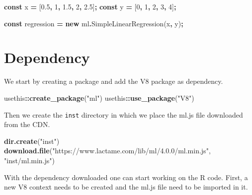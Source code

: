 \documentclass[
]{krantz}
\makeatletter
\newenvironment{Shaded}{\begin{snugshade}}{\end{snugshade}}
\newcommand{\DecValTok}[1]{\textcolor[rgb]{0.06,0.06,0.06}{#1}}
\newcommand{\FloatTok}[1]{\textcolor[rgb]{0.06,0.06,0.06}{#1}}
\newcommand{\FunctionTok}[1]{\textcolor[rgb]{0,0,0}{#1}}
\newcommand{\KeywordTok}[1]{\textcolor[rgb]{0.27,0.27,0.27}{\textbf{#1}}}
\newcommand{\NormalTok}[1]{#1}
\newcommand{\OperatorTok}[1]{\textcolor[rgb]{0.43,0.43,0.43}{\textbf{#1}}}
\newcommand{\StringTok}[1]{\textcolor[rgb]{0.5,0.5,0.5}{#1}}
\newenvironment{kframe}{%
\medskip{}
\setlength{\fboxsep}{.8em}
 \def\at@end@of@kframe{}%
 \ifinner\ifhmode%
  \def\at@end@of@kframe{\end{minipage}}%
  \begin{minipage}{\columnwidth}%
 \fi\fi%
 \def\FrameCommand##1{\hskip\@totalleftmargin \hskip-\fboxsep
 \colorbox{shadecolor}{##1}\hskip-\fboxsep
     \hskip-\linewidth \hskip-\@totalleftmargin \hskip\columnwidth}%
 \MakeFramed {\advance\hsize-\width
   \@totalleftmargin\z@ \linewidth\hsize
   \@setminipage}}%
 {\par\unskip\endMakeFramed%
 \at@end@of@kframe}
\renewenvironment{Shaded}{\begin{kframe}}{\end{kframe}}
\makeatother
\begin{document}
\begin{Shaded}
\begin{Highlighting}[]
\KeywordTok{const}\NormalTok{ x }\OperatorTok{=}\NormalTok{ [}\FloatTok{0.5}\OperatorTok{,} \DecValTok{1}\OperatorTok{,} \FloatTok{1.5}\OperatorTok{,} \DecValTok{2}\OperatorTok{,} \FloatTok{2.5}\NormalTok{]}\OperatorTok{;}
\KeywordTok{const}\NormalTok{ y }\OperatorTok{=}\NormalTok{ [}\DecValTok{0}\OperatorTok{,} \DecValTok{1}\OperatorTok{,} \DecValTok{2}\OperatorTok{,} \DecValTok{3}\OperatorTok{,} \DecValTok{4}\NormalTok{]}\OperatorTok{;}

\KeywordTok{const}\NormalTok{ regression }\OperatorTok{=} \KeywordTok{new}\NormalTok{ ml}\OperatorTok{.}\FunctionTok{SimpleLinearRegression}\NormalTok{(x}\OperatorTok{,}\NormalTok{ y)}\OperatorTok{;}
\end{Highlighting}
\end{Shaded}

\hypertarget{dependency-1}{%
\section*{Dependency}\label{dependency-1}}


We start by creating a package and add the V8 package as dependency.

\begin{Shaded}
\begin{Highlighting}[]
\NormalTok{usethis}\OperatorTok{::}\KeywordTok{create\_package}\NormalTok{(}\StringTok{"ml"}\NormalTok{)}
\NormalTok{usethis}\OperatorTok{::}\KeywordTok{use\_package}\NormalTok{(}\StringTok{"V8"}\NormalTok{)}
\end{Highlighting}
\end{Shaded}

Then we create the \texttt{inst} directory in which we place the ml.js file downloaded from the CDN.

\begin{Shaded}
\begin{Highlighting}[]
\KeywordTok{dir.create}\NormalTok{(}\StringTok{"inst"}\NormalTok{)}
\KeywordTok{download.file}\NormalTok{(}\StringTok{"https://www.lactame.com/lib/ml/4.0.0/ml.min.js"}\NormalTok{, }\StringTok{"inst/ml.min.js"}\NormalTok{)}
\end{Highlighting}
\end{Shaded}

With the dependency downloaded one can start working on the R code. First, a new V8 context needs to be created and the ml.js file need to be imported in it.
\end{document}
